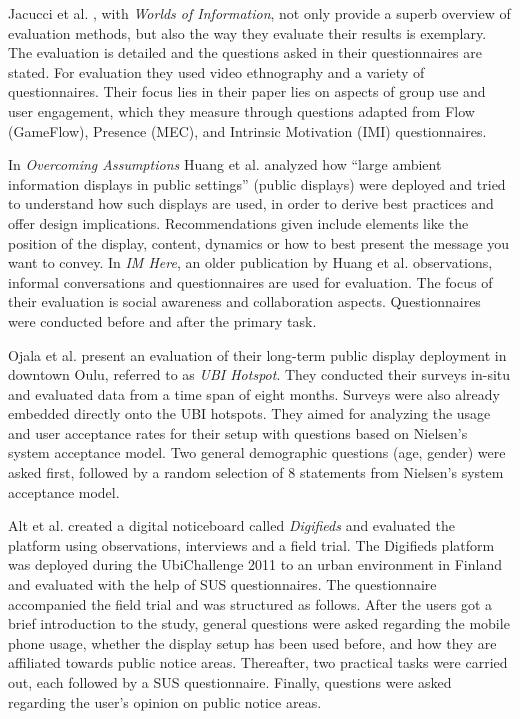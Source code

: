 	Jacucci et al. \cite{jacucci2010worldsofinformation}, with \textit{Worlds of Information}, not only provide a superb overview of evaluation methods, but also the way they evaluate their results is exemplary. The evaluation is detailed and the questions asked in their questionnaires are stated. For evaluation they used video ethnography and a variety of questionnaires. Their focus lies in their paper lies on aspects of group use and user engagement, which they measure through questions adapted from Flow (GameFlow), Presence (MEC), and Intrinsic Motivation (IMI) questionnaires.

	In \textit{Overcoming Assumptions} Huang et al. \cite{huang2008overcoming} analyzed how ``large ambient information displays in public settings'' (public displays) were deployed and tried to understand how such displays are used, in order to derive best practices and offer design implications. Recommendations given include elements like the position of the display, content, dynamics or how to best present the message you want to convey.
	In \textit{IM Here}, an older publication by Huang et al. \cite{Huang2004} observations, informal conversations and questionnaires are used for evaluation. The focus of their evaluation is social awareness and collaboration aspects. Questionnaires were conducted before and after the primary task.

	Ojala et al. present an evaluation of their long-term public display deployment in downtown Oulu, referred to as \textit{UBI Hotspot}. They conducted their surveys in-situ and evaluated data from a time span of eight months. Surveys were also already embedded directly onto the UBI hotspots. They aimed for analyzing the usage and user acceptance rates for their setup with questions based on Nielsen's system acceptance model. Two general demographic questions (age, gender) were asked first, followed by a random selection of 8 statements from Nielsen's system acceptance model.


	Alt et al. \cite{alt2011digifieds} created a digital noticeboard called \textit{Digifieds} and evaluated the platform using observations, interviews and a field trial. The Digifieds platform was deployed during the UbiChallenge 2011 to an urban environment in Finland and evaluated with the help of SUS questionnaires. The questionnaire accompanied the field trial and was structured as follows. After the users got a brief introduction to the study, general questions were asked regarding the mobile phone usage, whether the display setup has been used before, and how they are affiliated towards public notice areas. Thereafter, two practical tasks were carried out, each followed by a SUS questionnaire. Finally, questions were asked regarding the user's opinion on public notice areas. 



